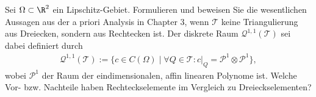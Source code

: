 
\begin{exercise}

Sei $\Omega \subset \R^2$ ein Lipschitz-Gebiet. Formulieren und beweisen Sie die
wesentlichen Aussagen aus der a priori Analysis in Chapter 3, wenn $\mathcal{T}$
keine Triangulierung aus Dreiecken, sondern aus Rechtecken ist. Der diskrete
Raum $\mathcal{Q}^{1,1}(\mathcal{T})$ sei dabei definiert durch
\begin{align}
  \mathcal{Q}^{1,1}(\mathcal{T}) := \{c \in C(\Omega) \mid
  \forall Q \in \mathcal{T}: c|_Q = \mathcal{P}^1 \otimes \mathcal{P}^1\},
\end{align}
wobei $\mathcal{P}^1$ der Raum der eindimensionalen, affin linearen Polynome ist.
Welche Vor- bzw. Nachteile haben Rechteckselemente im Vergleich zu Dreieckselementen?
\end{exercise}


\begin{solution}

\phantom{}

\end{solution}

